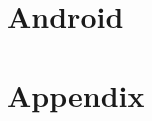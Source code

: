 \documentclass{report}
\begin{document}
\maketitle

\tableofcontents



%

\part{Android}
\label{chap:android}







%
%

\appendix
\part*{Appendix}


\printbibliography
\end{document}
